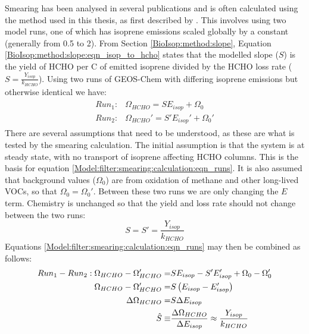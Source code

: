       Smearing has been analysed in several publications \parencite[e.g.,][]{Martin2003, Palmer2003, Millet2006, Stavrakou2009, Marais2012, Barkley2013, Zhu2014, Wolfe2016, Surl2018} and is often calculated using the method used in this thesis, as first described by \textcite{Palmer2003}.
      This involves using two model runs, one of which has isoprene emissions scaled globally by a constant (generally from 0.5 to 2).
      From Section \ref{BioIsop:method:slope}, Equation \ref{BioIsop:method:slope:eqn_isop_to_hcho} states that the modelled slope ($S$) is the yield of HCHO per C of emitted isoprene divided by the HCHO loss rate ($S = \frac{Y_{isop}}{k_{HCHO}}$).
      Using two runs of GEOS-Chem with differing isoprene emissions but otherwise identical we have:
      \begin{eqnarray}
      \label{Model:filter:smearing:calculation:eqn_runs}
      \begin{split}
      Run_1 :&  \Omega_{HCHO} = S E_{isop} + \Omega_0 \\
      Run_2 :&  \Omega_{HCHO}' = S' E_{isop}' + \Omega_0' 
      \end{split}
      \end{eqnarray}
      There are several assumptions that need to be understood, as these are what is tested by the smearing calculation.
      The initial assumption is that the system is at steady state, with no transport of isoprene affecting HCHO columns.
      This is the basis for equation \ref{Model:filter:smearing:calculation:eqn_runs}.
      It is also assumed that background values ($\Omega_0$) are from oxidation of methane and other long-lived VOCs, so that $\Omega_0 = \Omega_0'$.
      Between these two runs we are only changing the $E$ term.
      Chemistry is unchanged so that the yield and loss rate should not change between the two runs: 
      \begin{equation}
      S = S' = \frac{Y_{isop}}{k_{HCHO}}
      \end{equation}
      Equations \ref{Model:filter:smearing:calculation:eqn_runs} may then be combined as follows:
      \begin{eqnarray}
      Run_1-Run_2 : \Omega_{HCHO} - \Omega_{HCHO}' = & S E_{isop} - S' E_{isop}' +\Omega_0 - \Omega_0' \notag \\
      \Omega_{HCHO} - \Omega_{HCHO}' = & S \left( E_{isop} - E_{isop}' \right) \notag \\
      \Delta \Omega_{HCHO} = & S \Delta E_{isop}  \notag \\
      \hat{S} \equiv & \frac{\Delta{\Omega_{HCHO}}}{\Delta E_{isop}} \approx \frac{Y_{isop}}{k_{HCHO}} \label{Model:filter:smearing:calculation:eqn_hats}
      \end{eqnarray}
